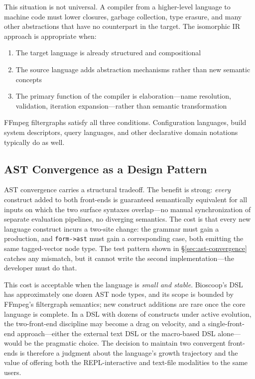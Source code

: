 \documentclass[english,submission]{programming}
\begin{document}
This situation is not universal. A compiler from a higher-level language to machine code must lower closures, garbage collection, type erasure, and many other abstractions that have no counterpart in the target. The isomorphic IR approach is appropriate when:

\begin{enumerate}
\item The target language is already structured and compositional
\item The source language adds abstraction mechanisms rather than new semantic concepts
\item The primary function of the compiler is elaboration---name resolution, validation, iteration expansion---rather than semantic transformation
\end{enumerate}

FFmpeg filtergraphs satisfy all three conditions. Configuration languages, build system descriptors, query languages, and other declarative domain notations typically do as well.

\subsection{AST Convergence as a Design Pattern}

AST convergence carries a structural tradeoff. The benefit is strong:
\emph{every} construct added to both front-ends is guaranteed semantically
equivalent for all inputs on which the two surface syntaxes overlap---no manual
synchronization of separate evaluation pipelines, no diverging semantics. The
cost is that every new language construct incurs a two-site change: the grammar
must gain a production, and \texttt{form->ast} must gain a corresponding case,
both emitting the same tagged-vector node type. The test pattern shown in
\S\ref{sec:ast-convergence} catches any mismatch, but it cannot write the
second implementation---the developer must do that.

This cost is acceptable when the language is \emph{small and stable}.
Bioscoop's DSL has approximately one dozen AST node types, and its scope is
bounded by FFmpeg's filtergraph semantics; new construct additions are rare once
the core language is complete. In a DSL with dozens of constructs under active
evolution, the two-front-end discipline may become a drag on velocity, and a
single-front-end approach---either the external text DSL or the macro-based DSL
alone---would be the pragmatic choice. The decision to maintain two convergent
front-ends is therefore a judgment about the language's growth trajectory and
the value of offering both the REPL-interactive and text-file modalities to the
same users.
\end{document}
